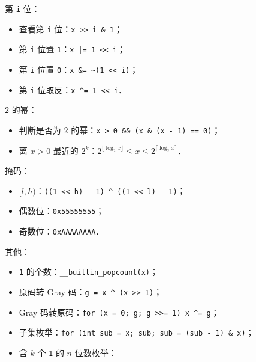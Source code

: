 第 {\tt i} 位：

\begin{itemize}[noitemsep]
    \item 查看第 {\tt i} 位：{\tt x >> i \& 1}；
    \item 第 {\tt i} 位置 {\tt 1}：{\tt x |= 1 << i}；
    \item 第 {\tt i} 位置 {\tt 0}：{\tt x \&= \textasciitilde(1 << i)}；
    \item 第 {\tt i} 位取反：{\tt x \textasciicircum= 1 << i}．
\end{itemize}

$2$ 的幂：

\begin{itemize}[noitemsep]
    \item 判断是否为 $2$ 的幂：{\tt x > 0 \&\& (x \& (x - 1) == 0)}；
    \item 离 $x > 0$ 最近的 $2^k$：$2^{\lfloor \log_2 x \rfloor} \le x \le 2^{\lceil \log_2 x \rceil}$．
\end{itemize}

掩码：

\begin{itemize}[noitemsep]
    \item $[l, h)$：{\tt ((1 << h) - 1) \textasciicircum{} ((1 << l) - 1)}；
    \item 偶数位：{\tt 0x55555555}；
    \item 奇数位：{\tt 0xAAAAAAAA}．
\end{itemize}

其他：

\begin{itemize}[noitemsep]
    \item {\tt 1} 的个数：{\tt \_\_builtin\_popcount(x)}；
    \item 原码转 Gray 码：{\tt g = x \textasciicircum {} (x >> 1)}；
    \item Gray 码转原码：{\tt for (x = 0; g; g >>= 1) x \textasciicircum= g}；
    \item 子集枚举：{\tt for (int sub = x; sub; sub = (sub - 1) \& x)}；
    \item 含 $k$ 个 {\tt 1} 的 $n$ 位数枚举：
    
\end{itemize}